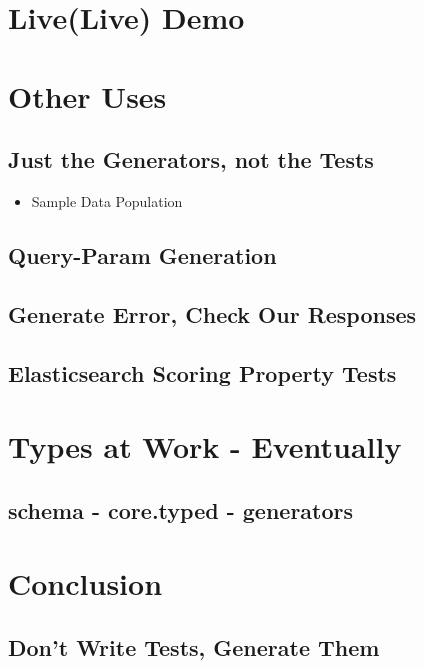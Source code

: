 \documentclass[11pt]{article}
\begin{document}
\section{Live(Live) Demo}
\label{sec-33}
\section{Other Uses}
\label{sec-34}

\subsection{Just the Generators, not the Tests}
\label{sec-34-1}
\begin{itemize}
\item Sample Data Population
\end{itemize}
\subsection{Query-Param Generation}
\label{sec-34-2}
\subsection{Generate Error, Check Our Responses}
\label{sec-34-3}
\subsection{Elasticsearch Scoring Property Tests}
\label{sec-34-4}
\section{Types at Work - Eventually}
\label{sec-35}

\subsection{schema - core.typed - generators}
\label{sec-35-1}
\section{Conclusion}
\label{sec-36}

\subsection{Don't Write Tests, Generate Them}
\label{sec-36-1}
\end{document}
